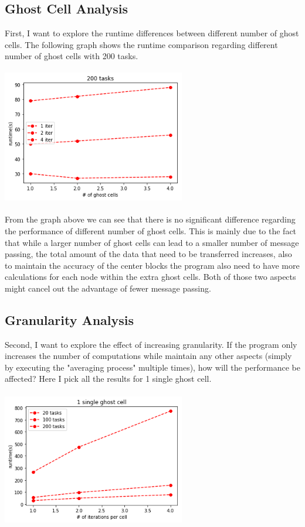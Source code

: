 \documentclass{cs4444}
\begin{document}
\subsection{Ghost Cell Analysis}
First, I want to explore the runtime differences between different number of ghost cells. The following graph shows the runtime comparison regarding different number of ghost cells with 200 tasks.
\begin{center}
\includegraphics[width=8cm, height=6cm]{fix_nodes}
\end{center}
From the graph above we can see that there is no significant difference regarding the performance of different number of ghost cells. This is mainly due to the fact that while a larger number of ghost cells can lead to a smaller number of message passing, the total amount of the data that need to be transferred increases, also to maintain the accuracy of the center blocks the program also need to have more calculations for each node within the extra ghost cells. Both of those two aspects might cancel out the advantage of fewer message passing.

\subsection{Granularity Analysis}
Second, I want to explore the effect of increasing granularity. If the program only increases the number of computations while maintain any other aspects (simply by executing the "averaging process" multiple times), how will the performance be affected? Here I pick all the results for 1 single ghost cell.
 
\begin{center}
\includegraphics[width=8cm, height=6cm]{fix_ghost}
\end{center}
\end{document}
